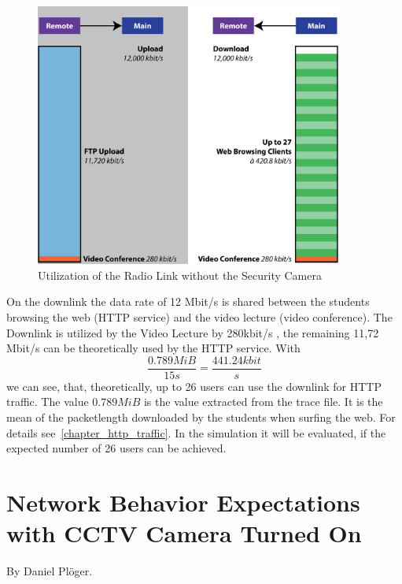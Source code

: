 \documentclass[a4paper,10pt]{book}\usepackage{graphicx}
\begin{document}
\begin{figure}[!ht]
  \begin{center}
    \includegraphics[width=0.9\textwidth]{graphics-02.eps}
    \caption{Utilization of the Radio Link without the Security Camera}
    \label{fig:rLink}
    \end{center}
\end{figure}

On the downlink the data rate of 12 Mbit/s is shared between the students browsing the web (HTTP service) and the video lecture (video conference).
The Downlink is utilized by the Video Lecture by 280kbit/s , the remaining 11,72 Mbit/s can be theoretically used by the HTTP service. With 
\begin{equation}
 \frac{0.789 MiB}{15s}=\frac{441.24 kbit}{s}
\end{equation}
we can see, that, theoretically, up to 26 users can use the downlink for HTTP traffic. The value $0.789MiB$ is the value extracted from the trace file. It is the mean of the packetlength downloaded by the students when surfing the web. For details see~\ref{chapter_http_traffic}.
In the simulation it will be evaluated, if the expected number of 26 users can be achieved.
\section{Network Behavior Expectations with CCTV Camera Turned On}
\label{chapter_expectations}
By Daniel Plöger.\\
\end{document}
